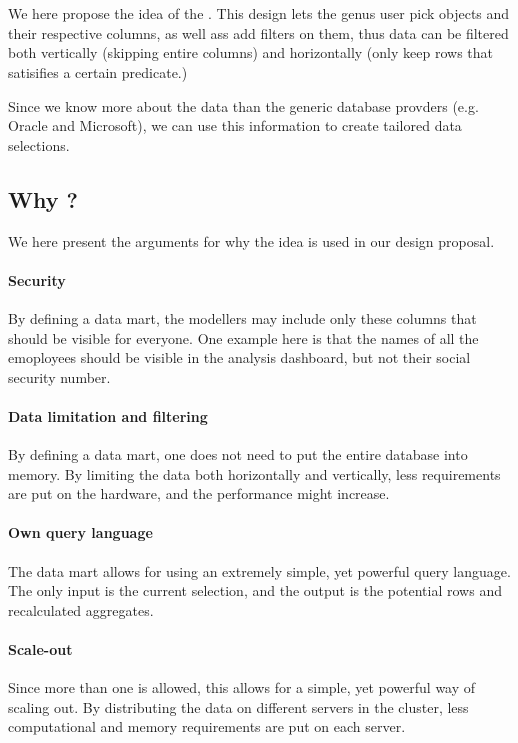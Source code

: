 \section{\datamart}
We here propose the idea of the \datamart. This design lets the genus user pick objects and their respective columns, as well ass add filters on them, thus data can be filtered both vertically (skipping entire columns) and horizontally (only keep rows that satisifies a certain predicate.)

Since we know more about the data than the generic database provders (e.g. Oracle and Microsoft), we can use this information to create tailored data selections.

\subsection{Why \datamart?}
\label{sub:Why \datamart?}
We here present the arguments for why the \datamart idea is used in our design proposal.

\paragraph{Security}
\label{par:Security}
By defining a data mart, the modellers may include only these columns that should be visible for everyone. One example here is that the names of all the emoployees should be visible in the analysis dashboard, but not their social security number.

\paragraph{Data limitation and filtering}
\label{par:Data limitation}
By defining a data mart, one does not need to put the entire database into memory. By limiting the data both horizontally and vertically, less requirements are put on the hardware, and the performance might increase.

\paragraph{Own query language}
\label{par:Own query language}
The data mart allows for using an extremely simple, yet powerful query language. The only input is the current selection, and the output is the potential rows and recalculated aggregates.

\paragraph{Scale-out}
\label{par:Scale-out}
Since more than one \datamart is allowed, this allows for a simple, yet powerful way of scaling out. By distributing the data on different servers in the cluster, less computational and memory requirements are put on each server.
